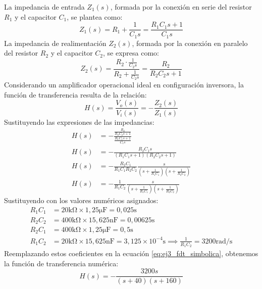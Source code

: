 La impedancia de entrada $Z_1(s)$, formada por la conexión en serie del resistor $R_1$ y el capacitor $C_1$, se plantea como:
\begin{equation*}
    Z_1(s) = R_1 + \frac{1}{C_1 s} = \frac{R_1 C_1 s + 1}{C_1 s}
\end{equation*}
La impedancia de realimentación $Z_2(s)$, formada por la conexión en paralelo del resistor $R_2$ y el capacitor $C_2$, se expresa como:
\begin{equation*}
    Z_2(s) = \frac{R_2 \cdot \frac{1}{C_2 s}}{R_2 + \frac{1}{C_2 s}} = \frac{R_2}{R_2 C_2 s + 1}
\end{equation*}
Considerando un amplificador operacional ideal en configuración inversora, la función de transferencia resulta de la relación:
\begin{equation*}
    H(s) = \frac{V_o(s)}{V_i(s)} = -\frac{Z_2(s)}{Z_1(s)}
\end{equation*}
Sustituyendo las expresiones de las impedancias:
{
\allowdisplaybreaks
\begin{align}
    H(s) &= -\frac{\frac{R_2}{R_2 C_2 s + 1}}{\frac{R_1 C_1 s + 1}{C_1 s}} \nonumber \\[6pt]
    H(s) &= -\frac{R_2 C_1 s}{(R_1 C_1 s + 1)(R_2 C_2 s + 1)} \nonumber \\[6pt]
    H(s) &= -\frac{R_2 C_1}{R_1 C_1 R_2 C_2} \frac{s}{\left(s + \frac{1}{R_1 C_1}\right) \left(s + \frac{1}{R_2 C_2}\right)} \nonumber \\[6pt]
    H(s) &= -\frac{1}{R_1 C_2} \frac{s}{\left(s + \frac{1}{R_1 C_1}\right) \left(s + \frac{1}{R_2 C_2}\right)}
    \label{eq:ej3_fdt_simbolica}
\end{align}
}
Sustituyendo con los valores numéricos asignados:
\begin{align*}
    R_1 C_1 &= 20 \si{\kilo\ohm} \times 1,25 \si{\micro\farad} = 0,025 \si{\second} \\[6pt]
    R_2 C_2 &= 400 \si{\kilo\ohm} \times 15,625 \si{\nano\farad} = 0,00625 \si{\second} \\[6pt]
    R_2 C_1 &= 400 \si{\kilo\ohm} \times 1,25 \si{\micro\farad} = 0,5 \si{\second} \\[6pt]
    R_1 C_2 &= 20 \si{\kilo\ohm} \times 15,625 \si{\nano\farad} = 3,125 \times 10^{-4} \si{\second} \implies \frac{1}{R_1 C_2} = 3200 \si{\radian\per\second}
\end{align*}
Reemplazando estos coeficientes en la ecuación \ref{eq:ej3_fdt_simbolica}, obtenemos la función de transferencia numérica:
\begin{equation}
    H(s) = -\frac{3200 s}{(s + 40)(s + 160)}
    \label{eq:ej3_fdt_numerica}
\end{equation}

